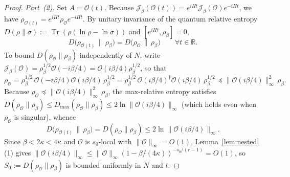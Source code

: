 \documentclass[11pt,a4paper]{article}
\numberwithin{equation}{section}
\theoremstyle{plain}
\theoremstyle{definition}
\newcommand{\Tr}{\operatorname{Tr}}
\begin{document}
\begin{proof}
\emph{Part~(2).} Set $A = \mathcal{O}(t)$. Because $\mathcal{J}_\beta(\mathcal{O}(t)) = e^{iHt}\mathcal{J}_\beta(\mathcal{O})e^{-iHt}$, we have $\rho_{\mathcal{O}(t)} = e^{iHt}\rho_{\mathcal{O}}e^{-iHt}$. By unitary invariance of the quantum relative entropy $D(\rho\|\sigma) := \Tr(\rho(\ln\rho - \ln\sigma))$ and $[e^{iHt},\rho_\beta]=0$,
\[
  D\bigl(\rho_{\mathcal{O}(t)}\,\big\|\,\rho_\beta\bigr) = D\bigl(\rho_{\mathcal{O}}\,\big\|\,\rho_\beta\bigr) \qquad \forall t\in\mathbb{R}.
\]
To bound $D(\rho_{\mathcal{O}}\|\rho_\beta)$ independently of $N$, write $\mathcal{J}_\beta(\mathcal{O}) = \rho_\beta^{1/2}\mathcal{O}(-i\beta/4) = \mathcal{O}(i\beta/4)\rho_\beta^{1/2}$, so that
\[
  \rho_{\mathcal{O}} = \rho_\beta^{1/2}\,\mathcal{O}(-i\beta/4)\mathcal{O}(i\beta/4)\,\rho_\beta^{1/2}
  = \rho_\beta^{1/2}\,\mathcal{O}(i\beta/4)^\dagger\mathcal{O}(i\beta/4)\,\rho_\beta^{1/2}
  \preceq \|\mathcal{O}(i\beta/4)\|_\infty^2\,\rho_\beta.
\]
Because $\rho_{\mathcal{O}} \preceq \|\mathcal{O}(i\beta/4)\|_\infty^2\,\rho_\beta$, the max-relative entropy satisfies $D(\rho_{\mathcal{O}}\|\rho_\beta) \le D_{\max}(\rho_{\mathcal{O}}\|\rho_\beta) \le 2\ln\|\mathcal{O}(i\beta/4)\|_\infty$ (which holds even when $\rho_{\mathcal{O}}$ is singular), whence
\begin{equation}\label{eq:rel-ent-bound}
  D\bigl(\rho_{\mathcal{O}(t)}\,\big\|\,\rho_\beta\bigr) = D(\rho_{\mathcal{O}}\|\rho_\beta) \le 2\ln\|\mathcal{O}(i\beta/4)\|_\infty.
\end{equation}
Since $\beta < 2\kappa < 4\kappa$ and $\mathcal{O}$ is $s_0$-local with $\|\mathcal{O}\|_\infty = O(1)$, Lemma~\ref{lem:nested}(1) gives $\|\mathcal{O}(i\beta/4)\|_\infty \le \|\mathcal{O}\|_\infty (1 - \beta/(4\kappa))^{-s_0/(r-1)} = O(1)$, so $S_0 := D(\rho_{\mathcal{O}}\|\rho_\beta)$ is bounded uniformly in $N$ and $t$.


\end{proof}
\end{document}
